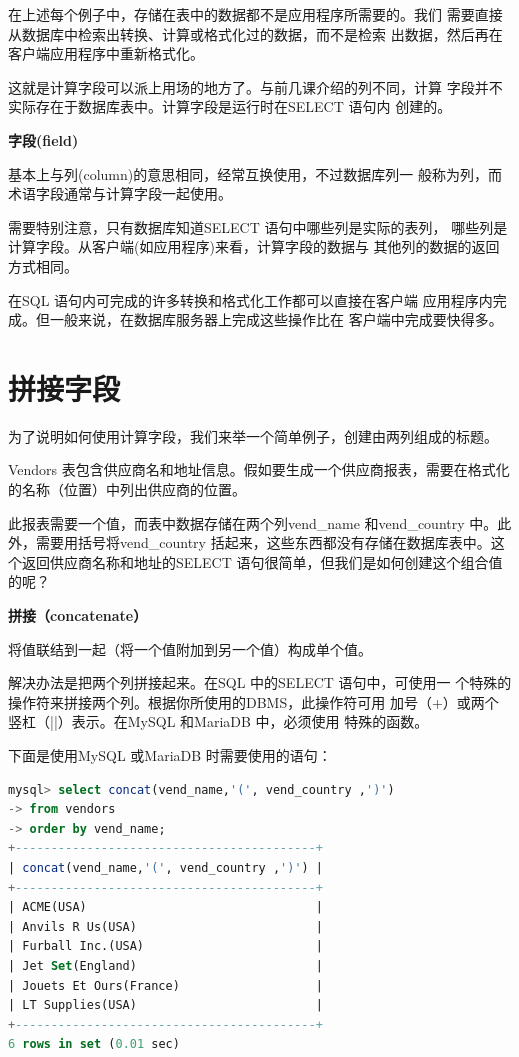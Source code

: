 \documentclass[11pt,a4paper,oneside]{book}
\begin{document}
在上述每个例子中，存储在表中的数据都不是应用程序所需要的。我们
需要直接从数据库中检索出转换、计算或格式化过的数据，而不是检索
出数据，然后再在客户端应用程序中重新格式化。

这就是计算字段可以派上用场的地方了。与前几课介绍的列不同，计算
字段并不实际存在于数据库表中。计算字段是运行时在SELECT 语句内
创建的。

\begin{tcolorbox}[colback=blue!7!white,colframe=blue!40]
\textbf{字段(field)}

基本上与列(column)的意思相同，经常互换使用，不过数据库列一
般称为列，而术语字段通常与计算字段一起使用。
\end{tcolorbox}

需要特别注意，只有数据库知道SELECT 语句中哪些列是实际的表列，
哪些列是计算字段。从客户端(如应用程序)来看，计算字段的数据与
其他列的数据的返回方式相同。

在SQL 语句内可完成的许多转换和格式化工作都可以直接在客户端
应用程序内完成。但一般来说，在数据库服务器上完成这些操作比在
客户端中完成要快得多。

\section{拼接字段}
为了说明如何使用计算字段，我们来举一个简单例子，创建由两列组成的标题。

Vendors 表包含供应商名和地址信息。假如要生成一个供应商报表，需要在格式化的名称（位置）中列出供应商的位置。

此报表需要一个值，而表中数据存储在两个列vend\_name 和vend\_country 中。此外，需要用括号将vend\_country 括起来，这些东西都没有存储在数据库表中。这个返回供应商名称和地址的SELECT 语句很简单，但我们是如何创建这个组合值的呢？

\begin{tcolorbox}[colback=blue!7!white,colframe=blue!40]
\textbf{拼接（concatenate）}

将值联结到一起（将一个值附加到另一个值）构成单个值。
\end{tcolorbox}

解决办法是把两个列拼接起来。在SQL 中的SELECT 语句中，可使用一
个特殊的操作符来拼接两个列。根据你所使用的DBMS，此操作符可用
加号（+）或两个竖杠（||）表示。在MySQL 和MariaDB 中，必须使用
特殊的函数。

下面是使用MySQL 或MariaDB 时需要使用的语句：
\begin{lstlisting}[language=sql]
mysql> select concat(vend_name,'(', vend_country ,')')
-> from vendors
-> order by vend_name;
+------------------------------------------+
| concat(vend_name,'(', vend_country ,')') |
+------------------------------------------+
| ACME(USA)                                |
| Anvils R Us(USA)                         |
| Furball Inc.(USA)                        |
| Jet Set(England)                         |
| Jouets Et Ours(France)                   |
| LT Supplies(USA)                         |
+------------------------------------------+
6 rows in set (0.01 sec)
\end{lstlisting}
\end{document}
